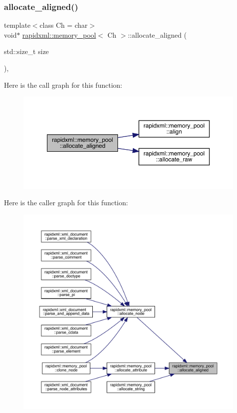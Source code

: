 \subsubsection{\texorpdfstring{allocate\_aligned()}{allocate\_aligned()}}
{\footnotesize\ttfamily template$<$class Ch  = char$>$ \\
void$\ast$ \mbox{\hyperlink{classrapidxml_1_1memory__pool}{rapidxml\+::memory\+\_\+pool}}$<$ Ch $>$\+::allocate\+\_\+aligned (\begin{DoxyParamCaption}\item[{std\+::size\+\_\+t}]{size }\end{DoxyParamCaption})\hspace{0.3cm}{\ttfamily [inline]}, {\ttfamily [private]}}

Here is the call graph for this function\+:\nopagebreak
\begin{figure}[H]
\begin{center}
\leavevmode
\includegraphics[width=350pt]{classrapidxml_1_1memory__pool_a4e9cf53fa5f9da3a8f31b754bd94b4ec_cgraph}
\end{center}
\end{figure}
Here is the caller graph for this function\+:\nopagebreak
\begin{figure}[H]
\begin{center}
\leavevmode
\includegraphics[width=350pt]{classrapidxml_1_1memory__pool_a4e9cf53fa5f9da3a8f31b754bd94b4ec_icgraph}
\end{center}
\end{figure}
